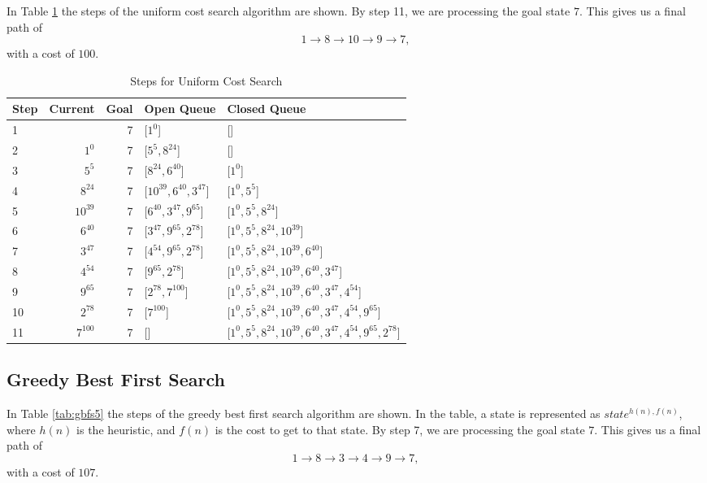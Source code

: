 \documentclass{article}
\begin{document}
    In Table \ref{tab:ucs5} the steps of the uniform cost search algorithm are shown. 
    By step 11, we are processing the goal state $7$. This gives us a final path of
    \begin{equation}
        1 \rightarrow 8 \rightarrow 10 \rightarrow 9 \rightarrow 7,
    \end{equation}
    with a cost of $100$.

    \begin{table}[!htp]\centering
        \caption{Steps for Uniform Cost Search}\label{tab:ucs5}
        \scriptsize
        \begin{tabular}{lrrll}\toprule
        Step &Current &Goal & Open Queue &Closed Queue  \\\midrule
        1&  &7 &[$1^{0}$] &[] \\
        2& $1^{0}$ &7 &[$5^{5}, 8^{24}$] &[] \\
        3& $5^{5}$ &7 &[$8^{24}, 6^{40}$] &[$1^{0}$] \\
        4& $8^{24}$ &7 &[$10^{39}, 6^{40}, 3^{47} $] &[$1^{0}, 5^{5}$] \\
        5& $10^{39}$ &7 &[$6^{40}, 3^{47}, 9^{65} $] &[$1^{0}, 5^{5}, 8^{24}$] \\
        6& $6^{40}$ &7 &[$3^{47}, 9^{65}, 2^{78}$] &[$1^{0}, 5^{5}, 8^{24}, 10^{39}$] \\
        7& $3^{47}$ &7 &[$4^{54}, 9^{65}, 2^{78}$] &[$1^{0}, 5^{5}, 8^{24}, 10^{39}, 6^{40}$] \\
        8& $4^{54}$ &7 &[$9^{65}, 2^{78}$] &[$1^{0}, 5^{5}, 8^{24}, 10^{39}, 6^{40}, 3^{47}$] \\
        9& $9^{65}$ &7 &[$2^{78}, 7^{100}$] &[$1^{0}, 5^{5}, 8^{24}, 10^{39}, 6^{40}, 3^{47}, 4^{54}$] \\
        10& $2^{78}$ &7 &[$7^{100}$] &[$1^{0}, 5^{5}, 8^{24}, 10^{39}, 6^{40}, 3^{47}, 4^{54}, 9^{65}$] \\
        11& $7^{100}$ &7 &[] &[$1^{0}, 5^{5}, 8^{24}, 10^{39}, 6^{40}, 3^{47}, 4^{54}, 9^{65}, 2^{78}$] \\
        \end{tabular}
    \end{table}

\subsection{Greedy Best First Search}


    In Table \ref{tab:gbfs5} the steps of the greedy best first search algorithm are shown. In the table, a state is represented as $state^{h(n), f(n)}$, where $h(n)$ is the heuristic, and $f(n)$ is the cost to get to that state.
    By step 7, we are processing the goal state $7$. This gives us a final path of
    \begin{equation}
        1 \rightarrow 8 \rightarrow 3 \rightarrow 4 \rightarrow 9 \rightarrow 7,
    \end{equation}
    with a cost of $107$.
\end{document}
